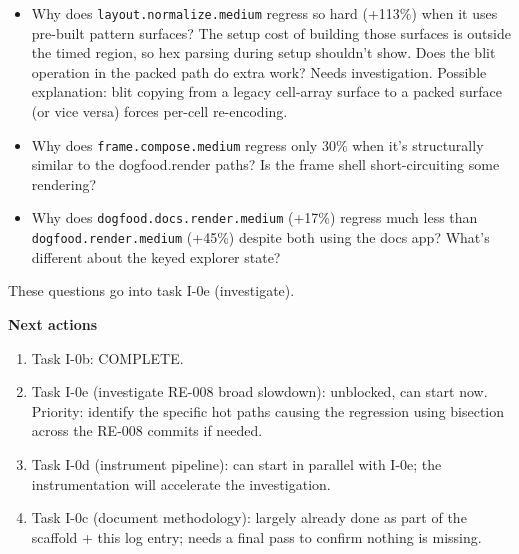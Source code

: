 \begin{itemize}
\tightlist
\item
  Why does \texttt{l\allowbreak{}a\allowbreak{}y\allowbreak{}o\allowbreak{}u\allowbreak{}t\allowbreak{}.\allowbreak{}n\allowbreak{}o\allowbreak{}r\allowbreak{}m\allowbreak{}a\allowbreak{}l\allowbreak{}i\allowbreak{}z\allowbreak{}e\allowbreak{}.\allowbreak{}m\allowbreak{}e\allowbreak{}d\allowbreak{}i\allowbreak{}u\allowbreak{}m} regress so hard (+113\%) when it uses pre-built pattern surfaces? The setup cost of building those surfaces is outside the timed region, so hex parsing during setup shouldn't show. Does the blit operation in the packed path do extra work? Needs investigation. Possible explanation: blit copying from a legacy cell-array surface to a packed surface (or vice versa) forces per-cell re-encoding.
\item
  Why does \texttt{f\allowbreak{}r\allowbreak{}a\allowbreak{}m\allowbreak{}e\allowbreak{}.\allowbreak{}c\allowbreak{}o\allowbreak{}m\allowbreak{}p\allowbreak{}o\allowbreak{}s\allowbreak{}e\allowbreak{}.\allowbreak{}m\allowbreak{}e\allowbreak{}d\allowbreak{}i\allowbreak{}u\allowbreak{}m} regress only 30\% when it's structurally similar to the dogfood.render paths? Is the frame shell short-circuiting some rendering?
\item
  Why does \texttt{d\allowbreak{}o\allowbreak{}g\allowbreak{}f\allowbreak{}o\allowbreak{}o\allowbreak{}d\allowbreak{}.\allowbreak{}d\allowbreak{}o\allowbreak{}c\allowbreak{}s\allowbreak{}.\allowbreak{}r\allowbreak{}e\allowbreak{}n\allowbreak{}d\allowbreak{}e\allowbreak{}r\allowbreak{}.\allowbreak{}m\allowbreak{}e\allowbreak{}d\allowbreak{}i\allowbreak{}u\allowbreak{}m} (+17\%) regress much less than \texttt{d\allowbreak{}o\allowbreak{}g\allowbreak{}f\allowbreak{}o\allowbreak{}o\allowbreak{}d\allowbreak{}.\allowbreak{}r\allowbreak{}e\allowbreak{}n\allowbreak{}d\allowbreak{}e\allowbreak{}r\allowbreak{}.\allowbreak{}m\allowbreak{}e\allowbreak{}d\allowbreak{}i\allowbreak{}u\allowbreak{}m} (+45\%) despite both using the docs app? What's different about the keyed explorer state?
\end{itemize}

These questions go into task I-0e (investigate).

\textbf{Next actions}

\begin{enumerate}
\def\labelenumi{\arabic{enumi}.}
\tightlist
\item
  Task I-0b: COMPLETE.
\item
  Task I-0e (investigate RE-008 broad slowdown): unblocked, can start now. Priority: identify the specific hot paths causing the regression using bisection across the RE-008 commits if needed.
\item
  Task I-0d (instrument pipeline): can start in parallel with I-0e; the instrumentation will accelerate the investigation.
\item
  Task I-0c (document methodology): largely already done as part of the scaffold + this log entry; needs a final pass to confirm nothing is missing.
\end{enumerate}

